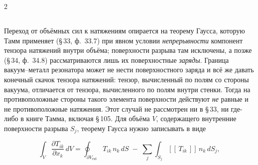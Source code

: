 \documentclass[twoside, 10pt]{article}
\def\myvspacebeforesubsection{-2.0mm}
\def\myvspaceaftersubsection{-2.5mm}
\begin{document}
\begin{multicols}{2}




\vspace{\myvspacebeforesubsection}
\subsection*{}
\vspace{\myvspaceaftersubsection}

Переход от объёмных сил к натяжениям опирается на теорему Гаусса, которую Тамм
применяет (\S\,33, ф.~33.7) при явном условии \emph{непрерывности} компонент
тензора натяжений внутри объёма; поверхности разрыва там исключены, а позже
(\S\,34, ф.~34.8) рассматриваются лишь их поверхностные \emph{заряды}. Граница
вакуум--металл резонатора может не нести поверхностного заряда и всё же давать
конечный скачок тензора натяжений: тензор, вычисленный по полям со стороны вакуума,
отличается от тензора, вычисленного по полям внутри стенки. Тогда на противоположные
стороны такого элемента поверхности действуют \emph{не} равные и не противоположные
натяжения. Этот случай не рассмотрен ни в \S\,33, ни где-либо в книге Тамма,
включая \S\,105. Для объёма $V$, содержащего внутренние поверхности разрыва $S_j$,
теорему Гаусса нужно записывать в виде
\end{multicols}
\[
\int_V \frac{\partial T_{ik}}{\partial x_k}\,dV
= \oint_{\partial V_{\mathrm{ext}}} T_{ik}\,n_k\,dS
\;-\; \sum_j \int_{S_j} [\![\,T_{ik}\,]\!]\,n_k\,dS_j ,
\]
\end{document}
